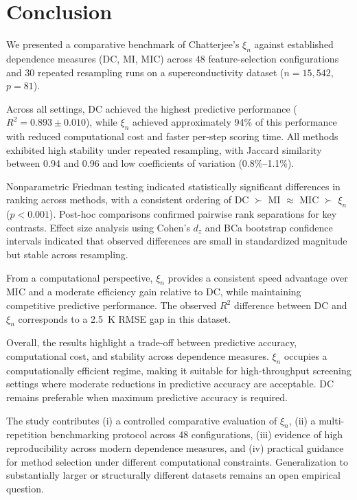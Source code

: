 \documentclass[twoside,11pt]{article}
\begin{document}
\section{Conclusion}

We presented a comparative benchmark of Chatterjee's $\xi_n$ against established dependence measures (DC, MI, MIC) across 48 feature-selection configurations and 30 repeated resampling runs on a superconductivity dataset ($n = 15{,}542$, $p = 81$).

Across all settings, DC achieved the highest predictive performance ($R^{2} = 0.893 \pm 0.010$), while $\xi_n$ achieved approximately 94\% of this performance with reduced computational cost and faster per-step scoring time. All methods exhibited high stability under repeated resampling, with Jaccard similarity between 0.94 and 0.96 and low coefficients of variation (0.8\%--1.1\%).

Nonparametric Friedman testing indicated statistically significant differences in ranking across methods, with a consistent ordering of DC $\succ$ MI $\approx$ MIC $\succ$ $\xi_n$ ($p < 0.001$). Post-hoc comparisons confirmed pairwise rank separations for key contrasts. Effect size analysis using Cohen's $d_z$ and BCa bootstrap confidence intervals indicated that observed differences are small in standardized magnitude but stable across resampling.

From a computational perspective, $\xi_n$ provides a consistent speed advantage over MIC and a moderate efficiency gain relative to DC, while maintaining competitive predictive performance. The observed $R^{2}$ difference between DC and $\xi_n$ corresponds to a 2.5~K RMSE gap in this dataset.

Overall, the results highlight a trade-off between predictive accuracy, computational cost, and stability across dependence measures. $\xi_n$ occupies a computationally efficient regime, making it suitable for high-throughput screening settings where moderate reductions in predictive accuracy are acceptable. DC remains preferable when maximum predictive accuracy is required.

The study contributes (i) a controlled comparative evaluation of $\xi_n$, (ii) a multi-repetition benchmarking protocol across 48 configurations, (iii) evidence of high reproducibility across modern dependence measures, and (iv) practical guidance for method selection under different computational constraints. Generalization to substantially larger or structurally different datasets remains an open empirical question.
\end{document}
